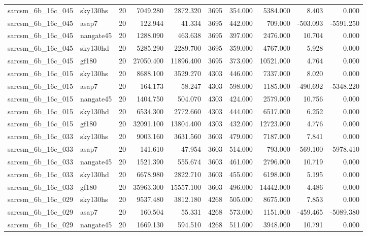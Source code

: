 \begin{tabular}{llrrrrrrrr}
sarcsm\_6b\_16c\_045 & sky130hs & 20 & 7049.280 & 2872.320 & 3695 & 354.000 & 5384.000 & 8.403 & 0.000 \\
sarcsm\_6b\_16c\_045 & asap7 & 20 & 122.944 & 41.334 & 3695 & 442.000 & 709.000 & -503.093 & -5591.250 \\
sarcsm\_6b\_16c\_045 & nangate45 & 20 & 1288.090 & 463.638 & 3695 & 397.000 & 2476.000 & 10.704 & 0.000 \\
sarcsm\_6b\_16c\_045 & sky130hd & 20 & 5285.290 & 2289.700 & 3695 & 359.000 & 4767.000 & 5.928 & 0.000 \\
sarcsm\_6b\_16c\_045 & gf180 & 20 & 27050.400 & 11896.400 & 3695 & 373.000 & 10521.000 & 4.764 & 0.000 \\
sarcsm\_6b\_16c\_015 & sky130hs & 20 & 8688.100 & 3529.270 & 4303 & 446.000 & 7337.000 & 8.020 & 0.000 \\
sarcsm\_6b\_16c\_015 & asap7 & 20 & 164.173 & 58.247 & 4303 & 598.000 & 1185.000 & -490.692 & -5348.220 \\
sarcsm\_6b\_16c\_015 & nangate45 & 20 & 1404.750 & 504.070 & 4303 & 424.000 & 2579.000 & 10.756 & 0.000 \\
sarcsm\_6b\_16c\_015 & sky130hd & 20 & 6534.300 & 2772.660 & 4303 & 444.000 & 6517.000 & 6.252 & 0.000 \\
sarcsm\_6b\_16c\_015 & gf180 & 20 & 32091.100 & 13804.400 & 4303 & 432.000 & 12723.000 & 4.776 & 0.000 \\
sarcsm\_6b\_16c\_033 & sky130hs & 20 & 9003.160 & 3631.560 & 3603 & 479.000 & 7187.000 & 7.841 & 0.000 \\
sarcsm\_6b\_16c\_033 & asap7 & 20 & 141.610 & 47.954 & 3603 & 514.000 & 793.000 & -569.100 & -5978.410 \\
sarcsm\_6b\_16c\_033 & nangate45 & 20 & 1521.390 & 555.674 & 3603 & 461.000 & 2796.000 & 10.719 & 0.000 \\
sarcsm\_6b\_16c\_033 & sky130hd & 20 & 6678.980 & 2822.710 & 3603 & 455.000 & 6198.000 & 5.195 & 0.000 \\
sarcsm\_6b\_16c\_033 & gf180 & 20 & 35963.300 & 15557.100 & 3603 & 496.000 & 14442.000 & 4.486 & 0.000 \\
sarcsm\_6b\_16c\_029 & sky130hs & 20 & 9537.480 & 3812.180 & 4268 & 505.000 & 8675.000 & 7.853 & 0.000 \\
sarcsm\_6b\_16c\_029 & asap7 & 20 & 160.504 & 55.331 & 4268 & 573.000 & 1151.000 & -459.465 & -5089.380 \\
sarcsm\_6b\_16c\_029 & nangate45 & 20 & 1669.130 & 594.510 & 4268 & 511.000 & 3948.000 & 10.791 & 0.000 \\

\end{tabular}
